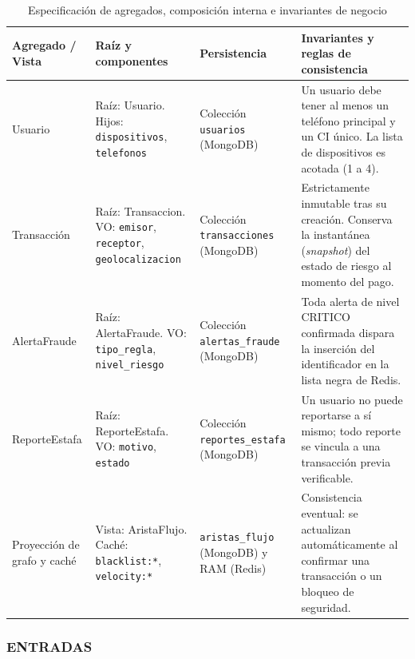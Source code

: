 \documentclass[11pt,a4paper]{article}
\begin{document}
	\begin{table}[H]
		\centering
		\caption{Especificación de agregados, composición interna e invariantes de negocio}
		\label{tab:agregados}
		\small
		\begin{tabularx}{\textwidth}{>{\raggedright\arraybackslash}p{2.2cm}>{\raggedright\arraybackslash}p{3.1cm}>{\raggedright\arraybackslash}p{2.6cm}Y}
			\toprule
			\textbf{Agregado / Vista} & \textbf{Raíz y componentes} & \textbf{Persistencia} & \textbf{Invariantes y reglas de consistencia} \\
			\midrule
			Usuario & Raíz: Usuario. Hijos: \texttt{dispositivos}, \texttt{telefonos} & Colección \texttt{usuarios} (MongoDB) & Un usuario debe tener al menos un teléfono principal y un CI único. La lista de dispositivos es acotada (1 a 4). \\
			Transacción & Raíz: Transaccion. VO: \texttt{emisor}, \texttt{receptor}, \texttt{geolocalizacion} & Colección \texttt{transacciones} (MongoDB) & Estrictamente inmutable tras su creación. Conserva la instantánea (\textit{snapshot}) del estado de riesgo al momento del pago. \\
			AlertaFraude & Raíz: AlertaFraude. VO: \texttt{tipo\_regla}, \texttt{nivel\_riesgo} & Colección \texttt{alertas\_fraude} (MongoDB) & Toda alerta de nivel CRITICO confirmada dispara la inserción del identificador en la lista negra de Redis. \\
			ReporteEstafa & Raíz: ReporteEstafa. VO: \texttt{motivo}, \texttt{estado} & Colección \texttt{reportes\_estafa} (MongoDB) & Un usuario no puede reportarse a sí mismo; todo reporte se vincula a una transacción previa verificable. \\
			Proyección de grafo y caché & Vista: AristaFlujo. Caché: \texttt{blacklist:*}, \texttt{velocity:*} & \texttt{aristas\_flujo} (MongoDB) y RAM (Redis) & Consistencia eventual: se actualizan automáticamente al confirmar una transacción o un bloqueo de seguridad. \\
			\bottomrule
		\end{tabularx}
	\end{table}
	
	\subsubsection*{ENTRADAS}
	
\end{document}
